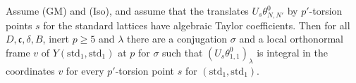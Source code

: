 \begin{lemma}\label{pf:reckernel:oneCopy}
Assume \textup{(GM)} and \textup{(Iso)}, and assume that the translates $U_s\theta^0_{N,N'}$ by $p'$-torsion points $s$ for
the standard lattices have algebraic Taylor coefficients. Then for all $D,\mathfrak c,\delta,B$, inert $p\ge5$ and
$\lambda$ there are a conjugation $\sigma$ and a local orthonormal frame $v$ of $Y(\mathrm{std}_1,\mathrm{std}_1)$ at $p$
for $\sigma$ such that $(U_s\theta^0_{1,1})_\lambda$ is integral in the coordinates $v$ for every $p'$-torsion point $s$ for
$(\mathrm{std}_1,\mathrm{std}_1)$.
\end{lemma}

